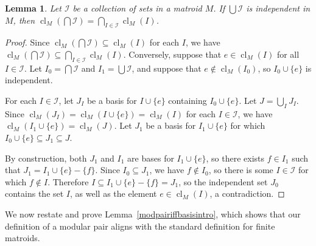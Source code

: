 \documentclass{amsart}
\theoremstyle{plain}
\newtheorem{lemma}[theorem]{Lemma}
\theoremstyle{definition}
\newcommand{\cI}{\mathcal{I}}
\DeclareMathOperator{\cl}{cl}
\newcommand{\br}[1]{\left(#1\right)}
\renewcommand{\ss}{\subseteq}
\begin{document}
\begin{lemma}\label{closureinter}
  Let $\cI$ be a collection of sets in a matroid $M$. If $\bigcup \cI$ is independent in $M$,
  then $\cl_M(\bigcap \cI) = \bigcap_{I \in \cI} \cl_M(I)$. 
\end{lemma}
\begin{proof}
  Since $\cl_M(\bigcap \cI) \ss \cl_M(I)$ for each $I$, we have $\cl_M(\bigcap \cI) \ss \bigcap_{I \in \cI} \cl_M(I)$. 
  Conversely, suppose that $e \in \cl_M(I)$ for all $I \in \cI$. Let $I_0 = \bigcap \cI$ and $I_1 = \bigcup \cI$, 
  and suppose that $e \notin \cl_M(I_0)$, so $I_0 \cup \{e\}$ is independent. 
  
  For each $I \in \cI$, let $J_I$ be a basis for $I \cup \{e\}$ containing $I_0 \cup \{e\}$. Let $J = \bigcup_I J_I$. 
  Since $\cl_M(J_I) = \cl_M(I \cup \{e\}) = \cl_M(I)$ for each $I \in \cI$, we have $\cl_M\br{I_1 \cup \{e\}} = \cl_M(J)$.
  Let $J_1$ be a basis for $I_1 \cup \{e\}$ for which $I_0 \cup \{e\} \ss J_1 \ss J$. 
  
  By construction, both $J_1$ and $I_1$ are bases for $I_1 \cup \{e\}$, so there exists $f \in I_1$ 
  such that $J_1 = I_1 \cup \{e\} - \{f\}$.
  Since $I_0 \ss J_1$, we have $f \notin I_0$, so 
  there is some $I \in \cI$ for which $f \notin I$. Therefore $I \ss I_1 \cup \{e\} - \{f\} = J_1$, 
  so the independent set $J_0$ contains the set $I$, as well as the element $e \in \cl_M(I)$, a contradiction. 
\end{proof}


We now restate and prove Lemma~\ref{modpairiffbasisintro}, which shows that our definition of a modular pair 
aligns with the standard definition for finite matroids. 
\end{document}
